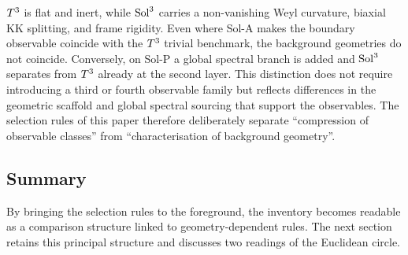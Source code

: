 $T^3$ is flat and inert, while $\mathrm{Sol}^3$ carries a non-vanishing Weyl
curvature, biaxial KK splitting, and frame rigidity.  Even where Sol-A makes
the boundary observable coincide with the $T^3$ trivial benchmark, the
background geometries do not coincide.  Conversely, on Sol-P a global
spectral branch is added and $\mathrm{Sol}^3$ separates from $T^3$ already
at the second layer.  This distinction does not require introducing a
third or fourth observable family but reflects differences in the geometric
scaffold and global spectral sourcing that support the observables.  The
selection rules of this paper therefore deliberately separate ``compression
of observable classes'' from ``characterisation of background geometry''.

\subsection{Summary}
\label{sec:rules:summary}

By bringing the selection rules to the foreground, the inventory becomes
readable as a comparison structure linked to geometry-dependent rules.  The
next section retains this principal structure and discusses two readings of
the Euclidean circle.
